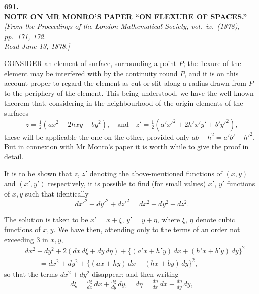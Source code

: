 \documentclass[11pt]{article}
\begin{document}

\begin{center}
{\Large\bfseries 691.}\\[8pt]
{\large\bfseries NOTE ON MR MONRO'S PAPER ``ON FLEXURE OF SPACES.''}\\[6pt]
\textit{[From the Proceedings of the London Mathematical Society, vol.~ix.\ (1878), pp.~171, 172.\\ Read June 13, 1878.]}
\end{center}

\medskip

\noindent CONSIDER an element of surface, surrounding a point $P$; the flexure of the element may be interfered with by the continuity round $P$, and it is on this account proper to regard the element as cut or slit along a radius drawn from $P$ to the periphery of the element. This being understood, we have the well-known theorem that, considering in the neighbourhood of the origin elements of the surfaces
\[
z = \tfrac{1}{2}(ax^{2} + 2hxy + by^{2}), \quad \text{and} \quad z' = \tfrac{1}{2}(a'x'^{2} + 2h'x'y' + b'y'^{2}),
\]
these will be applicable the one on the other, provided only $ab - h^{2} = a'b' - h'^{2}$. But in connexion with Mr Monro's paper it is worth while to give the proof in detail.

It is to be shown that $z$, $z'$ denoting the above-mentioned functions of $(x, y)$ and $(x', y')$ respectively, it is possible to find (for small values) $x'$, $y'$ functions of $x, y$ such that identically
\[
dx'^{2} + dy'^{2} + dz'^{2} = dx^{2} + dy^{2} + dz^{2}.
\]

The solution is taken to be $x' = x + \xi$, $y' = y + \eta$, where $\xi$, $\eta$ denote cubic functions of $x, y$. We have then, attending only to the terms of an order not exceeding 3 in $x, y$,
\begin{align*}
& dx^{2} + dy^{2} + 2(dx\,d\xi + dy\,d\eta) + \{(a'x + h'y)\,dx + (h'x + b'y)\,dy\}^{2} \\
&\qquad = dx^{2} + dy^{2} + \{(ax + hy)\,dx + (hx + by)\,dy\}^{2},
\end{align*}
so that the terms $dx^{2} + dy^{2}$ disappear; and then writing
\[
d\xi = \tfrac{d\xi}{dx}\,dx + \tfrac{d\xi}{dy}\,dy, \quad d\eta = \tfrac{d\eta}{dx}\,dx + \tfrac{d\eta}{dy}\,dy,
\]

\end{document}
